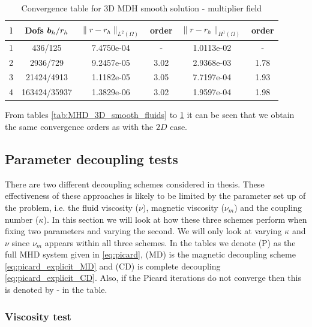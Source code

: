 \begin{table}[h!] \small
\begin{center}
\begin{tabular}{cccccc}
\hline
l &    Dofs $\boldsymbol b_h/r_h$ & $\|{r}-{r}_h\|_{L^2(\Omega)}$ & order & $\|{r}-{r}_h\|_{H^1(\Omega)}$ & order\\
\hline
 1 &     436/125 &       7.4750e-04 &     - &  1.0113e-02 &     - \\
 2 &    2936/729 &      9.2457e-05 &     3.02 &  2.9368e-03 &     1.78 \\
 3 &   21424/4913 &         1.1182e-05 &     3.05 &  7.7197e-04 &     1.93 \\
 4 &  163424/35937 &       1.3829e-06 &     3.02 &  1.9597e-04 &     1.98 \\
\hline
\end{tabular}
\caption{Convergence table for 3D MDH smooth solution - multiplier field}
\label{tab:MHD_3D_smooth_multiplier}
\end{center}
\end{table}

From tables \ref{tab:MHD_3D_smooth_fluids} to \ref{tab:MHD_3D_smooth_multiplier} it can be seen that we obtain the same convergence orders as with the $2D$ case.


\subsection{Parameter decoupling tests}
\label{sec:ParaTest}

There are two different decoupling schemes considered in thesis. These effectiveness of these approaches is likely to be limited by the parameter set up of the problem, i.e. the fluid viscosity ($\nu$), magnetic viscosity ($\nu_m$) and the coupling number ($\kappa$). In this section we will look at how these three schemes perform when fixing two parameters and varying the second. We will only look at varying $\kappa$ and $\nu$ since $\nu_m$ appears within all three schemes. In the tables we denote (P) as the full MHD system given in \cref{eq:picard}, (MD) is the magnetic decoupling scheme \cref{eq:picard_explicit_MD} and (CD) is complete decoupling \cref{eq:picard_explicit_CD}. Also, if the Picard iterations do not converge then this is denoted by - in the table.

\subsubsection{Viscosity test}


